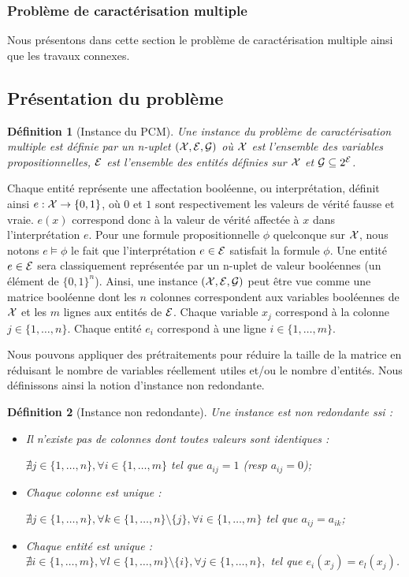 \documentclass[a4paper,10pt]{article}
\newtheorem{definition}{Définition}
\begin{document}
\subsubsection{Problème de caractérisation multiple}
Nous présentons dans cette section le problème de caractérisation multiple ainsi que  les travaux connexes.

\subsection{Présentation du problème}

\begin{definition}[Instance du PCM]
Une instance du problème de caractérisation multiple est définie par un n-uplet
$({\cal X}, {\cal E}, {\cal G})$ où $\cal X$ est l'ensemble des
variables propositionnelles, ${\cal E}$ est l'ensemble des entités définies sur
$\cal X$ et ${\cal G} \subseteq 2^{\cal E}$.
\end{definition}

Chaque entité représente une affectation booléenne, ou interprétation, définit ainsi  $e : {\cal X} \to \{0,1\}$, où  $0$ et $1$ sont respectivement les valeurs de vérité fausse et vraie. $e(x)$ correspond donc à la valeur de vérité affectée à $x$ dans l'interprétation $e$. Pour une formule propositionnelle  $\phi$ quelconque sur ${\cal X}$, nous notons $e \models \phi $ le fait que l'interprétation $e \in {\cal E}$ satisfait la formule $\phi$. Une entité $e \in {\cal E}$ sera classiquement représentée par un n-uplet de valeur booléennes (un élément de  $ \{0,1\}^n$).   Ainsi, une instance $({\cal X}, {\cal E}, {\cal G})$  peut être vue comme une matrice booléenne dont les $n$ colonnes correspondent aux variables booléennes de ${\cal X}$ et les $m$ lignes aux entités de ${\cal E}$.  Chaque variable $x_j$ correspond à la colonne $j \in \{1, \ldots, n \} $. Chaque entité $e_i$ correspond à une ligne $i \in \{1, \ldots, m \}$.

Nous pouvons appliquer des prétraitements pour réduire la taille de la matrice en réduisant le nombre de variables réellement utiles et/ou le nombre d'entités. Nous définissons ainsi la notion d'instance non redondante.

\begin{definition}[Instance non redondante]
Une instance est non redondante ssi :
\begin{itemize}
\item Il n'existe pas de colonnes dont toutes valeurs sont identiques :

$\nexists j \in \{1,\ldots, n \},\forall i \in \{1, \ldots, m \} $ tel que $a_{ij}=1$ (resp $a_{ij}=0$);
\item Chaque colonne est unique :

$\nexists j \in \{1, \ldots, n \},\forall k \in \{1, \ldots, n \} \setminus \{j\}, \forall i \in \{1, \ldots, m \} $ tel que $a_{ij}=a_{ik}$;
\item Chaque entité est unique : \\$ \nexists i \in \{1, \ldots, m \},
\forall l \in \{1, \ldots, m \} \setminus \{i\},\forall j \in \{1, \ldots, n \},$ tel que $e_i(x_j)=e_l(x_j)$.
\end{itemize}
\end{definition}
\end{document}
